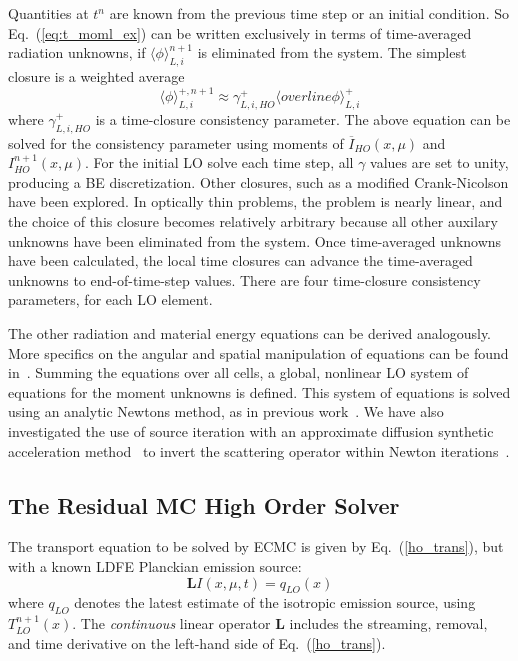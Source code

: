 \documentclass{anstrans}
\renewcommand{\eqref}[1]{(\ref{#1})}
\newcommand{\B}[1]{\ensuremath{\mathbf{#1}}}
\newcommand{\mom}[1]{\langle #1 \rangle}
\begin{document}
Quantities at $t^{n}$ are known from the previous time step or an initial condition.  
So Eq.~\eqref{eq:t_moml_ex} can be written exclusively in terms
of time-averaged radiation unknowns, if $\mom{\phi}_{L,i}^{n+1}$ is eliminated from the
system.  The simplest closure is a weighted average
\begin{equation}
    \mom{\phi}_{L,i}^{+,n+1} \approx \gamma_{L,i,HO}^+ \mom{overline{\phi}}_{L,i}^+
\end{equation}
where $\gamma_{L,i,HO}^+$ is a time-closure consistency parameter.  The above equation can be solved
for the consistency parameter using moments of $\overline{I}_{HO}(x,\mu)$ and
$I^{n+1}_{HO}(x,\mu)$.  For the initial LO solve each time step, all $\gamma$ values are set to unity, producing a BE discretization.
Other closures, such as a modified Crank-Nicolson have been explored.  In optically
thin problems, the problem is nearly linear, and the choice of this closure becomes
relatively arbitrary because all other auxilary unknowns have been eliminated from the system.
Once time-averaged unknowns have been calculated, the local time closures can advance the time-averaged unknowns to end-of-time-step
values.  There are four time-closure consistency parameters, for each LO element. 

The other radiation and material energy equations can be derived analogously.  More specifics on the angular and spatial
manipulation of equations can be found in~\cite{bolding_nse}.  
Summing the equations over all cells, a global, nonlinear LO system of equations for the
moment unknowns is defined.  This system of equations is solved using an analytic Newtons method, as in
previous work~\cite{bolding_nse}.  We have also investigated the use of source iteration
with an approximate diffusion synthetic acceleration method~\cite{wsa} to invert the scattering
operator within Newton iterations~\cite{wla}. 

\subsection*{The Residual MC High Order Solver}
\label{sec:ho}

The transport equation to be solved by ECMC is given by Eq.~\eqref{ho_trans}, but with a
known LDFE Planckian emission source:
\begin{equation}\label{te_oper}
    \B L I(x,\mu,t)  = q_{LO}(x)
\end{equation}
where $q_{LO}$ denotes the latest estimate of the isotropic emission source, using $T_{LO}^{n+1}(x)$.  The \emph{continuous} linear operator $\B L$ includes the streaming, removal, and
time derivative on the left-hand side of Eq.~\eqref{ho_trans}.  
\end{document}
